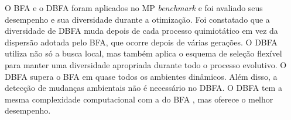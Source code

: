 O BFA e o DBFA foram aplicados no MP \textit{benchmark} e foi avaliado seus desempenho e sua diversidade durante a otimização. Foi constatado que a diversidade de DBFA muda depois de cada processo quimiotático em vez da dispersão adotada pelo BFA, que ocorre depois de várias gerações. O DBFA utiliza não só a busca local, mas também aplica o esquema de seleção flexível para manter uma diversidade apropriada durante todo o processo evolutivo. O DBFA supera o BFA em quase todos os ambientes dinâmicos. Além disso, a detecção de mudanças ambientais não é necessário no DBFA. O DBFA tem a mesma complexidade computacional com a do BFA , mas oferece o melhor desempenho.